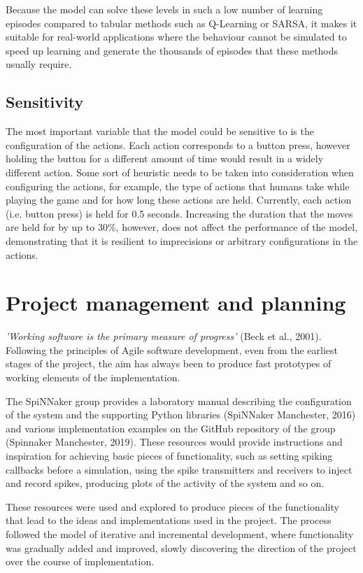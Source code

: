\documentclass[10pt]{article}
\begin{document}
    Because the model can solve these levels in such a low number of learning episodes compared to tabular methods such as Q-Learning or SARSA, it makes it suitable for real-world applications where the behaviour cannot be simulated to speed up learning and generate the thousands of episodes that these methods usually require.

    \subsection{Sensitivity}

    The most important variable that the model could be sensitive to is the configuration of the actions. Each action corresponds to a button press, however holding the button for a different amount of time would result in a widely different action. Some sort of heuristic needs to be taken into consideration when configuring the actions, for example, the type of actions that humans take while playing the game and for how long these actions are held. Currently, each action (i.e. button press) is held for 0.5 seconds. Increasing the duration that the moves are held for by up to 30\%, however, does not affect the performance of the model, demonstrating that it is resilient to imprecisions or arbitrary configurations in the actions.

    \section{Project management and planning}

    \textit{'Working software is the primary measure of progress'} (Beck et al., 2001). Following the principles of Agile software development, even from the earliest stages of the project, the aim has always been to produce fast prototypes of working elements of the implementation.

    The SpiNNaker group provides a laboratory manual describing the configuration of the system and the supporting Python libraries (SpiNNaker Manchester, 2016) and various implementation examples on the GitHub repository of the group (Spinnaker Manchester, 2019). These resources would provide instructions and inspiration for achieving basic pieces of functionality, such as setting spiking callbacks before a simulation, using the spike transmitters and receivers to inject and record spikes, producing plots of the activity of the system and so on.

    These resources were used and explored to produce pieces of the functionality that lead to the ideas and implementations used in the project. The process followed the model of iterative and incremental development, where functionality was gradually added and improved, slowly discovering the direction of the project over the course of implementation.
\end{document}
